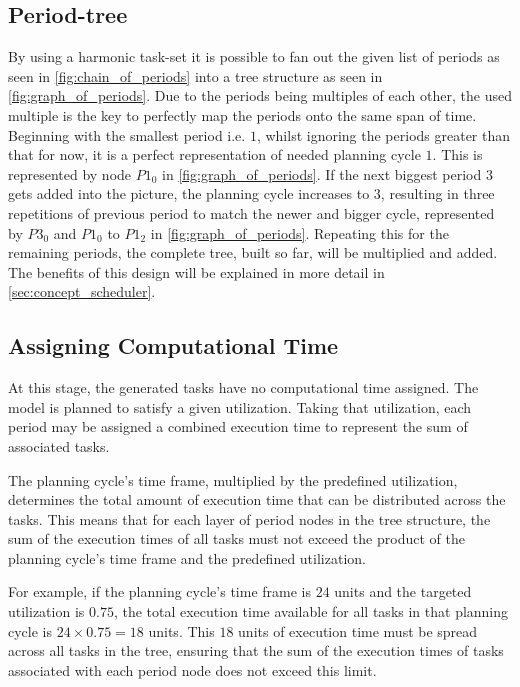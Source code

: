 \subsection{Period-tree}\label{sec:period_tree}
By using a harmonic task-set it is possible to fan out the given list of periods as seen in \cref{fig:chain_of_periods} into a tree structure as seen in \cref{fig:graph_of_periods}.
Due to the periods being multiples of each other, the used multiple is the key to perfectly map the periods onto the same span of time.
Beginning with the smallest period i.e. $1$, whilst ignoring the periods greater than that for now, it is a perfect representation of needed planning cycle $1$.
This is represented by node $P1_0$ in \cref{fig:graph_of_periods}.
If the next biggest period $3$ gets added into the picture, the planning cycle increases to $3$, resulting in three repetitions of previous period to match the newer and bigger cycle, represented by $P3_0$ and $P1_0$ to $P1_2$ in \cref{fig:graph_of_periods}.
Repeating this for the remaining periods, the complete tree, built so far, will be multiplied and added.
The benefits of this design will be explained in more detail in \cref{sec:concept_scheduler}.

\subsection{Assigning Computational Time}\label{sec:concept_load_spread}
At this stage, the generated tasks have no computational time assigned.
The model is planned to satisfy a given utilization.
Taking that utilization, each period may be assigned a combined execution time to represent the sum of associated tasks.

The planning cycle's time frame, multiplied by the predefined utilization, determines the total amount of execution time that can be distributed across the tasks.
This means that for each layer of period nodes in the tree structure, the sum of the execution times of all tasks must not exceed the product of the planning cycle's time frame and the predefined utilization.

For example, if the planning cycle's time frame is $24$ units and the targeted utilization is $0.75$, the total execution time available for all tasks in that planning cycle is \(24 \times 0.75 = 18\) units.
This $18$ units of execution time must be spread across all tasks in the tree, ensuring that the sum of the execution times of tasks associated with each period node does not exceed this limit.

